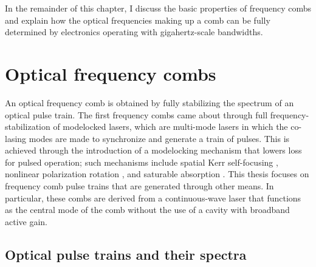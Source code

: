 In the remainder of this chapter, I discuss the basic properties of frequency combs and explain how the optical frequencies making up a comb can be fully determined by electronics operating with gigahertz-scale bandwidths.

\section{Optical frequency combs}

An optical frequency comb is obtained by fully stabilizing the spectrum of an optical pulse train. The first frequency combs came about through full frequency-stabilization of modelocked lasers, which are multi-mode lasers in which the co-lasing modes are made to synchronize and generate a train of pulses. This is achieved through the introduction of a modelocking mechanism that lowers loss for pulsed operation; such mechanisms include spatial Kerr self-focusing \cite{Spence1991,Brabec1992}, nonlinear polarization rotation \cite{Hofer1992,Fermann1993}, and saturable absorption \cite{Stankov1988}. This thesis focuses on frequency comb pulse trains that are generated through other means. In particular, these combs are derived from a continuous-wave laser that functions as the central mode of the comb without the use of a cavity with broadband active gain. 

\subsection{Optical pulse trains and their spectra}

